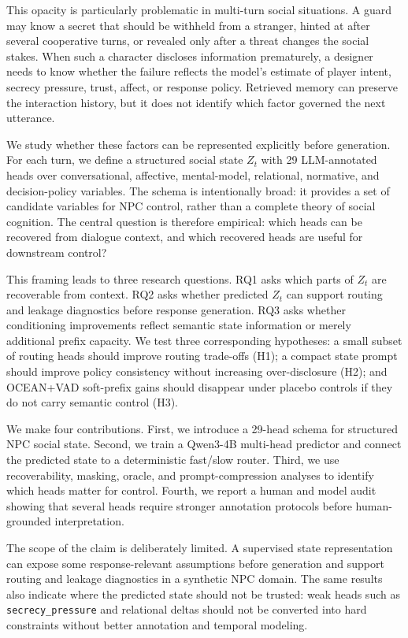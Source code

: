 \documentclass[11pt]{article}
\begin{document}
This opacity is particularly problematic in multi-turn social situations. A guard may know a secret that should be withheld from a stranger, hinted at after several cooperative turns, or revealed only after a threat changes the social stakes. When such a character discloses information prematurely, a designer needs to know whether the failure reflects the model's estimate of player intent, secrecy pressure, trust, affect, or response policy. Retrieved memory can preserve the interaction history, but it does not identify which factor governed the next utterance.

We study whether these factors can be represented explicitly before generation. For each turn, we define a structured social state $Z_t$ with 29 LLM-annotated heads over conversational, affective, mental-model, relational, normative, and decision-policy variables. The schema is intentionally broad: it provides a set of candidate variables for NPC control, rather than a complete theory of social cognition. The central question is therefore empirical: which heads can be recovered from dialogue context, and which recovered heads are useful for downstream control?

This framing leads to three research questions. RQ1 asks which parts of $Z_t$ are recoverable from context. RQ2 asks whether predicted $Z_t$ can support routing and leakage diagnostics before response generation. RQ3 asks whether conditioning improvements reflect semantic state information or merely additional prefix capacity. We test three corresponding hypotheses: a small subset of routing heads should improve routing trade-offs (H1); a compact state prompt should improve policy consistency without increasing over-disclosure (H2); and OCEAN+VAD soft-prefix gains should disappear under placebo controls if they do not carry semantic control (H3).

We make four contributions. First, we introduce a 29-head schema for structured NPC social state. Second, we train a Qwen3-4B multi-head predictor and connect the predicted state to a deterministic fast/slow router. Third, we use recoverability, masking, oracle, and prompt-compression analyses to identify which heads matter for control. Fourth, we report a human and model audit showing that several heads require stronger annotation protocols before human-grounded interpretation.

The scope of the claim is deliberately limited. A supervised state representation can expose some response-relevant assumptions before generation and support routing and leakage diagnostics in a synthetic NPC domain. The same results also indicate where the predicted state should not be trusted: weak heads such as \texttt{secrecy\_pressure} and relational deltas should not be converted into hard constraints without better annotation and temporal modeling.
\end{document}
